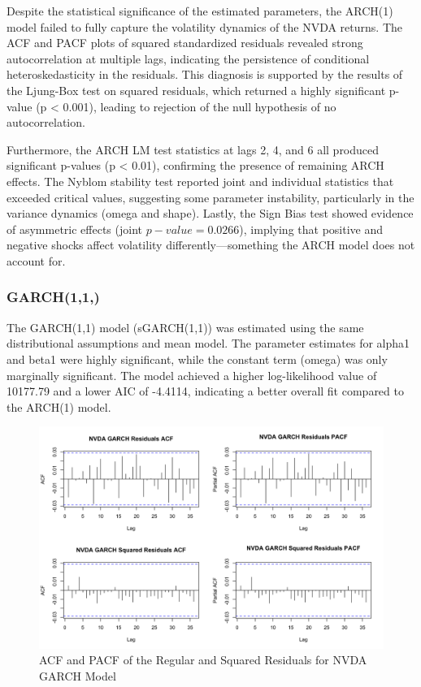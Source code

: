 \documentclass[12pt]{article}
\begin{document}
Despite the statistical significance of the estimated parameters, the ARCH(1) model failed to fully capture the volatility dynamics of the NVDA returns. The ACF and PACF plots of squared standardized residuals revealed strong autocorrelation at multiple lags, indicating the persistence of conditional heteroskedasticity in the residuals. This diagnosis is supported by the results of the Ljung-Box test on squared residuals, which returned a highly significant p-value (p < 0.001), leading to rejection of the null hypothesis of no autocorrelation.

Furthermore, the ARCH LM test statistics at lags 2, 4, and 6 all produced significant p-values (p < 0.01), confirming the presence of remaining ARCH effects. The Nyblom stability test reported joint and individual statistics that exceeded critical values, suggesting some parameter instability, particularly in the variance dynamics (omega and shape). Lastly, the Sign Bias test showed evidence of asymmetric effects (joint $p-value = 0.0266$), implying that positive and negative shocks affect volatility differently—something the ARCH model does not account for.

\subsubsection*{GARCH(1,1,)}

The GARCH(1,1) model (sGARCH(1,1)) was estimated using the same distributional assumptions and mean model. The parameter estimates for alpha1 and beta1 were highly significant, while the constant term (omega) was only marginally significant. The model achieved a higher log-likelihood value of 10177.79 and a lower AIC of -4.4114, indicating a better overall fit compared to the ARCH(1) model.

\begin{figure}[!h]
	\centering
	\includegraphics[width=0.8\linewidth]{plots/GARCH_NVDA.png}
	\caption{ACF and PACF of the Regular and Squared Residuals for NVDA GARCH Model}
	\label{fig:garch_nvda}
\end{figure}
\end{document}
